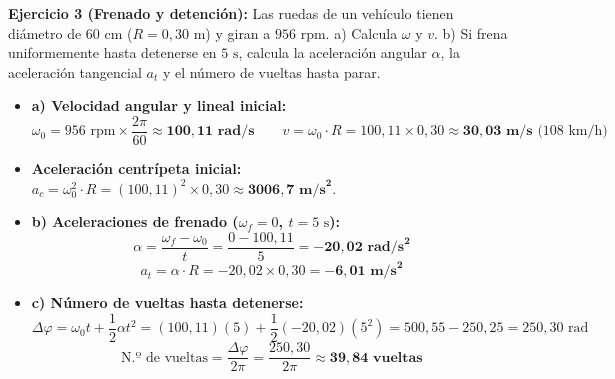 ﻿\documentclass[11pt,a4paper]{article}
\begin{document}
\vspace{0.3cm}
\noindent\textbf{Ejercicio 3 (Frenado y detención):} Las ruedas de un vehículo tienen diámetro de $60\text{ cm}$ ($R = 0{,}30\text{ m}$) y giran a $956\text{ rpm}$. a) Calcula $\omega$ y $v$. b) Si frena uniformemente hasta detenerse en $5\text{ s}$, calcula la aceleración angular $\alpha$, la aceleración tangencial $a_t$ y el número de vueltas hasta parar.

\begin{itemize}[leftmargin=1.5em, itemsep=3pt]
    \item \textbf{a) Velocidad angular y lineal inicial:}
    \[
    \omega_0 = 956\text{ rpm} \times \frac{2\pi}{60} \approx \mathbf{100{,}11\text{ rad/s}} \qquad v = \omega_0 \cdot R = 100{,}11 \times 0{,}30 \approx \mathbf{30{,}03\text{ m/s}} \text{ (108 km/h)}
    \]
    \item \textbf{Aceleración centrípeta inicial:} $a_c = \omega_0^2 \cdot R = (100{,}11)^2 \times 0{,}30 \approx \mathbf{3006{,}7\text{ m/s}^2}$.
    \item \textbf{b) Aceleraciones de frenado ($\omega_f = 0$, $t = 5\text{ s}$):}
    \[
    \alpha = \frac{\omega_f - \omega_0}{t} = \frac{0 - 100{,}11}{5} = \mathbf{-20{,}02\text{ rad/s}^2}
    \]
    \[
    a_t = \alpha \cdot R = -20{,}02 \times 0{,}30 = \mathbf{-6{,}01\text{ m/s}^2}
    \]
    \item \textbf{c) Número de vueltas hasta detenerse:}
    \[
    \Delta\varphi = \omega_0 t + \frac{1}{2}\alpha t^2 = (100{,}11)(5) + \frac{1}{2}(-20{,}02)(5^2) = 500{,}55 - 250{,}25 = 250{,}30\text{ rad}
    \]
    \[
    \text{N.º de vueltas} = \frac{\Delta\varphi}{2\pi} = \frac{250{,}30}{2\pi} \approx \mathbf{39{,}84\text{ vueltas}}
    \]
\end{itemize}
\end{document}
